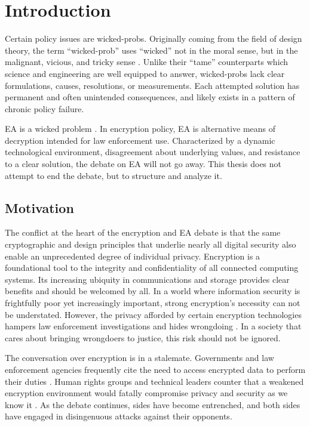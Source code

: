 \chapter{Introduction}
\label{chap-introduction}

Certain policy issues are \acp{wicked-prob}. Originally coming from the field of design theory, the term
``\ac{wicked-prob}'' uses ``wicked'' not in the moral sense, but in the malignant, vicious, and tricky sense
\cite{rittel_dilemmas_1973}. Unlike their ``tame'' counterparts which science and engineering are well equipped to
answer, \acp{wicked-prob} lack clear formulations, causes, resolutions, or measurements. Each attempted solution has
permanent and often unintended consequences, and likely exists in a pattern of chronic policy failure.

\Acl{EA} is a wicked problem \cite{rozenshtein_wicked_2018}. In encryption policy, \ac{EA} is alternative means of
decryption intended for law enforcement use. Characterized by a dynamic technological environment, disagreement about
underlying values, and resistance to a clear solution, the debate on \ac{EA} will not go away. This thesis does not
attempt to end the debate, but to structure and analyze it.


\section{Motivation}
\label{sec-motivation}

The conflict at the heart of the encryption and \ac{EA} debate is that the same cryptographic and design principles that
underlie nearly all digital security also enable an unprecedented degree of individual privacy. Encryption is a
foundational tool to the integrity and confidentiality of all connected computing systems. Its increasing ubiquity in
communications and storage provides clear benefits and should be welcomed by all. In a world where information security
is frightfully poor yet increasingly important, strong encryption's necessity can not be understated. However, the
privacy afforded by certain encryption technologies hampers law enforcement investigations and hides wrongdoing
\cite{cox_2020} \cite{keller_internet_2019}. In a society that cares about bringing wrongdoers to justice, this risk
should not be ignored.

The conversation over encryption is in a stalemate. Governments and law enforcement agencies frequently cite the need to
access encrypted data to perform their duties \cite{ministerial_2018} \cite{fbi_2020}. Human rights groups and technical
leaders counter that a weakened encryption environment would fatally compromise privacy and security as we know it
\cite{ruiz_there_2018} \cite{abelson_2015}. As the debate continues, sides have become entrenched, and both sides have
engaged in disingenuous attacks against their opponents.

